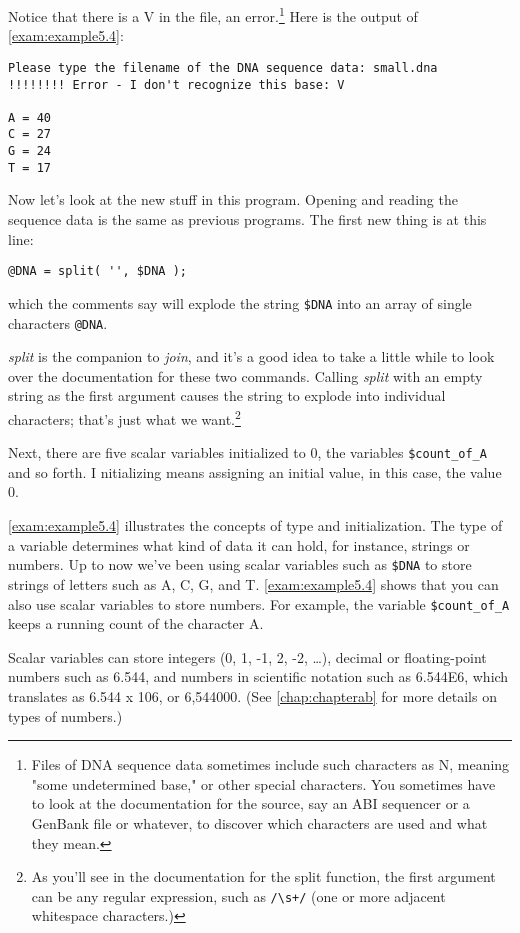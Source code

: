 Notice that there is a V in the file, an error.\footnote{Files of DNA sequence data sometimes include such characters as N, meaning "some undetermined base," or other special characters.  You sometimes have to look at the documentation for the source, say an ABI sequencer or a GenBank file or whatever, to discover which characters are used and what they mean.} Here is the output of \autoref{exam:example5.4}:

\begin{lstlisting}
Please type the filename of the DNA sequence data: small.dna
!!!!!!!! Error - I don't recognize this base: V

A = 40
C = 27
G = 24
T = 17
\end{lstlisting}

Now let's look at the new stuff in this program. Opening and reading the sequence data is the same as previous programs. The first new thing is at this line:

\begin{lstlisting}
@DNA = split( '', $DNA );
\end{lstlisting}

which the comments say will explode the string \verb|$DNA| into an array of single characters \verb|@DNA|.

\textit{split} is the companion to \textit{join}, and it's a good idea to take a little while to look over the documentation for these two commands. Calling \textit{split} with an empty string as the first argument causes the string to explode into individual characters; that's just what we want.\footnote{As you'll see in the documentation for the split function, the first argument can be any regular expression, such as \verb|/\s+/| (one or more adjacent whitespace characters.)}

Next, there are five scalar variables initialized to 0, the variables \verb|$count_of_A| and so forth. I nitializing means assigning an initial value, in this case, the value 0. 

\autoref{exam:example5.4} illustrates the concepts of type and initialization. The type of a variable determines what kind of data it can hold, for instance, strings or numbers. Up to now we've been using scalar variables such as \verb|$DNA| to store strings of letters such as A, C, G, and T. \autoref{exam:example5.4} shows that you can also use scalar variables to store numbers. For example, the variable \verb|$count_of_A| keeps a running count of the character A.

Scalar variables can store integers (0, 1, -1, 2, -2, \ldots), decimal or floating-point numbers such as 6.544, and numbers in scientific notation such as 6.544E6, which translates as 6.544 x 106, or 6,544000.  (See \autoref{chap:chapterab} for more details on types of numbers.)

